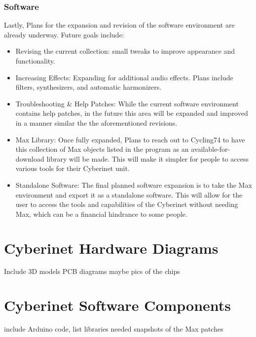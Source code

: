\subsection{Software}
Lastly, Plans for the expansion and revision of the software environment are already underway. Future goals include:
\begin{itemize}
    \item Revising the current collection: small tweaks to improve appearance and functionality.
    \item Increasing Effects: Expanding for additional audio effects. Plans include filters, synthesizers, and automatic harmonizers.
    \item Troubleshooting \& Help Patches: While the current software environment contains help patches, in the future this area will be expanded and improved in a manner similar the the aforementioned revisions.
    \item Max Library: Once fully expanded, Plans to reach out to Cycling74 to have this collection of Max objects listed in the program as an available-for-download library will be made. This will make it simpler for people to access various tools for their Cyberinet unit.
    \item Standalone Software: The final planned software expansion is to take the Max environment and export it as a standalone software. This will allow for the user to access the tools and capabilities of the Cyberinet without needing Max, which can be a financial hindrance to some people.
\end{itemize}



\appendix

\chapter{Cyberinet Hardware Diagrams}
Include 3D models
PCB diagrams
maybe pics of the chips

\chapter{Cyberinet Software Components}
include Arduino code, list libraries needed
snapshots of the Max patches

